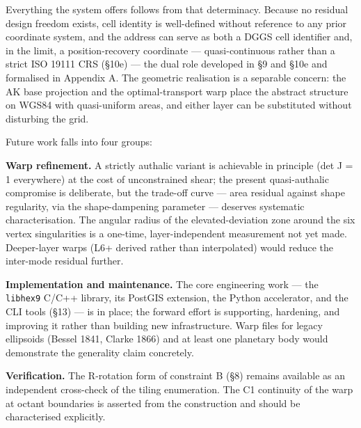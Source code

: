 \documentclass[
  11pt,
  a4paper,
]{article}
\begin{document}
Everything the system offers follows from that determinacy. Because no
residual design freedom exists, cell identity is well-defined without
reference to any prior coordinate system, and the address can serve as
both a DGGS cell identifier and, in the limit, a position-recovery
coordinate --- quasi-continuous rather than a strict ISO 19111 CRS
(§10e) --- the dual role developed in §9 and §10e and formalised in
Appendix A. The geometric realisation is a separable concern: the AK
base projection and the optimal-transport warp place the abstract
structure on WGS84 with quasi-uniform areas, and either layer can be
substituted without disturbing the grid.

Future work falls into four groups:

\textbf{Warp refinement.} A strictly authalic variant is achievable in
principle (det J = 1 everywhere) at the cost of unconstrained shear; the
present quasi-authalic compromise is deliberate, but the trade-off curve
--- area residual against shape regularity, via the shape-dampening
parameter --- deserves systematic characterisation. The angular radius
of the elevated-deviation zone around the six vertex singularities is a
one-time, layer-independent measurement not yet made. Deeper-layer warps
(L6+ derived rather than interpolated) would reduce the inter-mode
residual further.

\textbf{Implementation and maintenance.} The core engineering work ---
the \texttt{libhex9} C/C++ library, its PostGIS extension, the Python
accelerator, and the CLI tools (§13) --- is in place; the forward effort
is supporting, hardening, and improving it rather than building new
infrastructure. Warp files for legacy ellipsoids (Bessel 1841, Clarke
1866) and at least one planetary body would demonstrate the generality
claim concretely.

\textbf{Verification.} The R-rotation form of constraint B (§8) remains
available as an independent cross-check of the tiling enumeration. The
C1 continuity of the warp at octant boundaries is asserted from the
construction and should be characterised explicitly.
\end{document}
